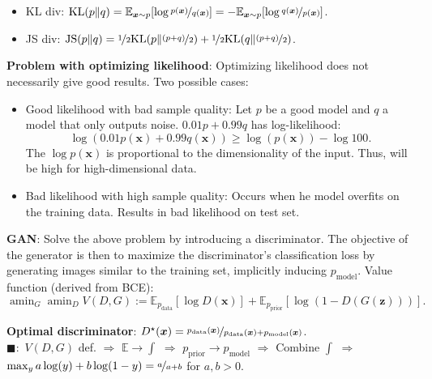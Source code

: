 \documentclass{article}
\DeclareMathOperator*{\argmin}{amin}
\newcommand{\lft}{\mathopen{}\mathclose\bgroup\left}
\newcommand{\rgt}{\aftergroup\egroup\right}
\newcommand{\E}{\mathbb{E}}
\renewcommand{\vec}[1]{\bm{#1}}
\newenvironment{topic}[1]
{\textbf{\sffamily \colorbox{black}{\rlap{\textbf{\textcolor{white}{#1}}}\hspace{\linewidth}\hspace{-2\fboxsep}}} \\ \vspace{0.2cm}}
{}
\begin{document}
\begin{multicols*}{2}
\begin{topic}{Normalizing flow}
    \end{topic}

    \begin{topic}{Generative adversarial network}

        \begin{itemize}
            \item KL div: $\mathrm{KL}(p \lVert q) = \E_{\vec{x} \sim p} \lft[ \log \nicefrac{p(\vec{x})}{q(\vec{x})}
                          \rgt] = - \E_{\vec{x} \sim p} \lft[ \log \nicefrac{q(\vec{x})}{p(\vec{x})} \rgt]$.
            \item JS div: $\mathrm{JS}(p \lVert q) = \nicefrac{1}{2} \mathrm{KL}\lft(p \middle\lVert \nicefrac{(p +
                              q)}{2} \rgt) + \nicefrac{1}{2} \mathrm{KL}\lft( q \middle\lVert \nicefrac{(p + q)}{2} \rgt)$.
        \end{itemize}

        \textbf{Problem with optimizing likelihood}: Optimizing likelihood does not necessarily give good results. Two possible cases:
        \begin{itemize}
            \item Good likelihood with bad sample quality: Let $p$ be a good model and $q$ a model that only outputs
                  noise. $0.01p + 0.99q$ has log-likelihood: \[
                      \log(0.01p(\vec{x}) + 0.99q(\vec{x})) \geq \log(p(\vec{x})) - \log 100.
                  \]
                  The $\log p(\vec{x})$ is proportional to the dimensionality of the input. Thus, will be high for
                  high-dimensional data.

            \item Bad likelihood with high sample quality: Occurs when he model overfits on the training data.
                  Results in bad likelihood on test set.

        \end{itemize}

        \textbf{GAN}: Solve the above problem by introducing a discriminator. The objective of the
        generator is then to maximize the discriminator's classification loss by generating images
        similar to the training set, implicitly inducing $p_{\mathrm{model}}$. Value function (derived from BCE): \[
            \argmin\nolimits_{G} \argmin\nolimits_{D} V(D, G) := \E_{p_{\mathrm{data}}}[\log D(\vec{x})] + \E_{p_{\mathrm{prior}}} [\log (1 - D(G(\vec{z})))].
        \]

        \textbf{Optimal discriminator}: $D^\star(\vec{x}) = \nicefrac{p_{\mathrm{data}}(\vec{x})}{p_{\mathrm{data}}(\vec{x}) + p_{\mathrm{model}}(\vec{x})}$. \\
        $\blacksquare:$ $V(D,G)$ def. $\Rightarrow$ $\E \to \int$ $\Rightarrow$ $p_{\mathrm{prior}} \to p_{\mathrm{model}}$ $\Rightarrow$ Combine $\int$ $\Rightarrow$ $\max_y a \log(y) + b \log(1-y) = \nicefrac{a}{a+b}$ for $a,b > 0$.


\end{topic}
\end{multicols*}
\end{document}

